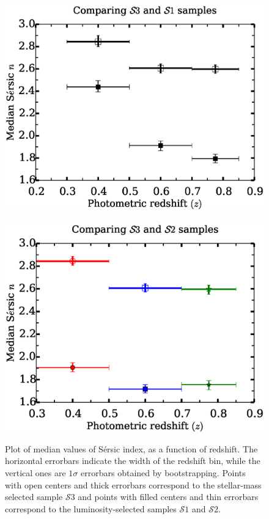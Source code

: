 \documentclass[twocolumn,useAMS,usenatbib]{mn2e}
\newcommand{\sersic}{S\'{e}rsic }
\newcommand{\s}{\ensuremath{\mathcal{S}}}
\begin{document}
\begin{figure}
 \centering
 \includegraphics[width=1.0\columnwidth]{median_sersicn_wide} \
 \includegraphics[width=1.0\columnwidth]{median_sersicn2_wide} 
 \caption{ Plot of median values of \sersic index, as a function of redshift. The horizontal errorbars indicate
           the width of the redshift bin, while the vertical ones are $1\sigma$ errorbars obtained by
           bootstrapping. Points with open centers and thick errorbars correspond to the stellar-mass selected sample \s$3$
           and points with filled centers and thin errorbars correspond to the luminosity-selected samples \s$1$ and \s$2$.    
         }
 \label{fig:median_sersicn_wide}
\end{figure}
\end{document}
